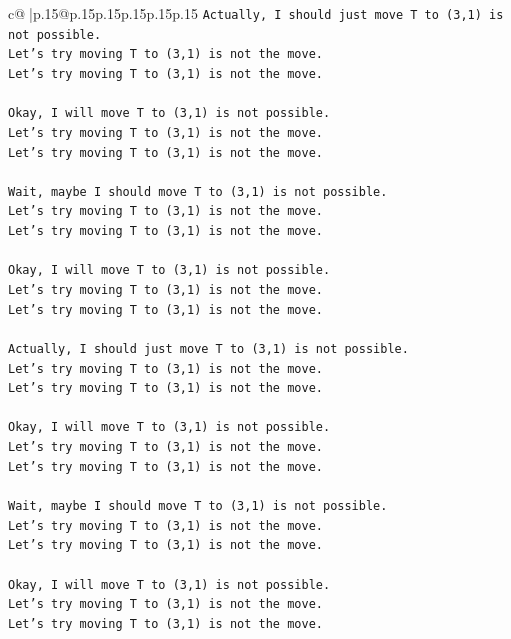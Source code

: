 \documentclass{article}
\begin{document}
{\begin{supertabular}{c@{$\;$}|p{.15\linewidth}@{}p{.15\linewidth}p{.15\linewidth}p{.15\linewidth}p{.15\linewidth}p{.15\linewidth}}
{{{\texttt{Actually, I should just move T to (3,1) is not possible.} \\
\texttt{Let's try moving T to (3,1) is not the move.} \\
\texttt{Let's try moving T to (3,1) is not the move.} \\
\\ 
\texttt{Okay, I will move T to (3,1) is not possible.} \\
\texttt{Let's try moving T to (3,1) is not the move.} \\
\texttt{Let's try moving T to (3,1) is not the move.} \\
\\ 
\texttt{Wait, maybe I should move T to (3,1) is not possible.} \\
\texttt{Let's try moving T to (3,1) is not the move.} \\
\texttt{Let's try moving T to (3,1) is not the move.} \\
\\ 
\texttt{Okay, I will move T to (3,1) is not possible.} \\
\texttt{Let's try moving T to (3,1) is not the move.} \\
\texttt{Let's try moving T to (3,1) is not the move.} \\
\\ 
\texttt{Actually, I should just move T to (3,1) is not possible.} \\
\texttt{Let's try moving T to (3,1) is not the move.} \\
\texttt{Let's try moving T to (3,1) is not the move.} \\
\\ 
\texttt{Okay, I will move T to (3,1) is not possible.} \\
\texttt{Let's try moving T to (3,1) is not the move.} \\
\texttt{Let's try moving T to (3,1) is not the move.} \\
\\ 
\texttt{Wait, maybe I should move T to (3,1) is not possible.} \\
\texttt{Let's try moving T to (3,1) is not the move.} \\
\texttt{Let's try moving T to (3,1) is not the move.} \\
\\ 
\texttt{Okay, I will move T to (3,1) is not possible.} \\
\texttt{Let's try moving T to (3,1) is not the move.} \\
\texttt{Let's try moving T to (3,1) is not the move.} \\
}}}
\end{supertabular}}
\end{document}
